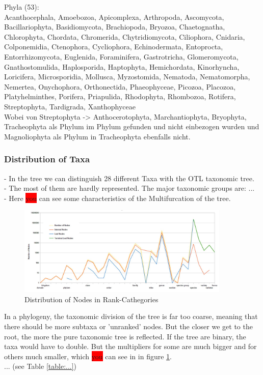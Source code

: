     Phyla (53): \\
    Acanthocephala, Amoebozoa, Apicomplexa, Arthropoda, Ascomycota, Bacillariophyta, Basidiomycota, 
      Brachiopoda, Bryozoa, Chaetognatha, Chlorophyta, Chordata, Chromerida, Chytridiomycota, 
      Ciliophora, Cnidaria, Colponemidia, Ctenophora, Cycliophora, Echinodermata, Entoprocta, 
      Entorrhizomycota, Euglenida, Foraminifera, Gastrotricha, Glomeromycota, Gnathostomulida, 
      Haplosporida, Haptophyta, Hemichordata, Kinorhyncha, Loricifera, Microsporidia, Mollusca, 
      Myzostomida, Nematoda, Nematomorpha, Nemertea, Onychophora, Orthonectida, Phaeophyceae, 
      Picozoa, Placozoa, Platyhelminthes, Porifera, Priapulida, Rhodophyta, Rhombozoa, Rotifera, 
      Streptophyta, Tardigrada, Xanthophyceae \\
    Wobei von Streptophyta -> Anthocerotophyta, Marchantiophyta, Bryophyta, Tracheophyta als
      Phylum im Phylum gefunden und nicht einbezogen wurden und Magnoliophyta als Phylum in 
      Tracheophyta ebenfalls nicht. \\

    \subsubsection{Distribution of Taxa}
    - In the tree we can distinguish 28 different Taxa with the OTL taxonomic tree. \\
    - The most of them are hardly represented. The major taxonomic groups are: ... \\
    - Here \colorbox{red}{you} can see some characteristics of the Multifurcation of the tree. \\
    \begin{figure}[h!]
      \centering
      \includegraphics[width=0.9\textwidth]{Figures/TaxaTable2.JPG}
      \caption{Distribution of Nodes in Rank-Cathegories}
      \label{fig:taxaTable2}
    \end{figure}
    In a phylogeny, the taxonomic division of the tree is far too coarse, meaning that there should 
      be more subtaxa or 'unranked' nodes. But the closer we get to the root, the more the pure
      taxonomic tree is reflected. If the tree are binary, the taxa would have to double. But the 
      multipliers for some are much bigger and for others much smaller, which \colorbox{red}{you} can see in in figure 
      \ref{fig:taxaTable2}. \\
      ... (see Table \ref{table:...})
    
